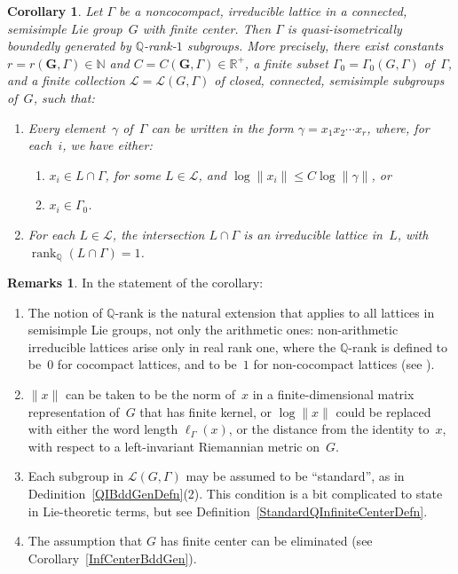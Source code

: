 \documentclass[pdftex]{sigma}
\newcommand{\NN}{\mathbb{N}}
\newcommand{\QQ}{\mathbb{Q}}
\newcommand{\RR}{\mathbb{R}}
\newcommand{\Ga}{\mathbf{G}}
\DeclareMathOperator{\rank}{rank}
\newcommand{\subgroups}{\mathcal{L}}
\numberwithin{equation}{section}
\newtheorem{cor}[thm]{Corollary}
\theoremstyle{definition}
\newtheorem{rems}[thm]{Remarks}
\begin{document}
\begin{cor} \label{QIBddGenLie}
Let $\Gamma$ be a noncocompact, irreducible lattice in a connected, semisimple Lie group~$G$ with finite center. Then $\Gamma$ is quasi-isometrically boundedly generated by $\QQ$-rank-$1$ subgroups. More precisely, there exist constants $r = r(\Ga,\Gamma) \in \NN$ and $C = C(\Ga,\Gamma) \in \RR^+$, a finite subset $\Gamma_0 = \Gamma_0(G,\Gamma)$ of~$\Gamma$, and a finite collection $\subgroups = \subgroups(G,\Gamma)$ of closed, connected, semisimple subgroups of~$G$, such that:
	\begin{enumerate}\itemsep=0pt
\item[$1.$] %
	 Every element~$\gamma$ of~$\Gamma$ can be written in the form $\gamma = x_1 x_2 \cdots x_r$, where, for each~$i$, we have either:
\begin{enumerate}\itemsep=0pt
\item[$(a)$] %
		$x_i \in L \cap \Gamma$, for some $L \in \subgroups$, and $\log \|x_i\| \le C \log \|\gamma\|$,
		or
\item[$(b)$] $x_i \in \Gamma_0$.
		\end{enumerate}
\item[$2.$] For each $L \in \subgroups$, the intersection $L \cap \Gamma$ is an irreducible lattice in~$L$, with $\rank_\QQ (L \cap \Gamma) = 1$.

	\end{enumerate}
\end{cor}

\begin{rems}
In the statement of the corollary:
\begin{enumerate}\itemsep=0pt
	\item The notion of $\QQ$-rank is the natural extension that applies to all lattices in semisimple Lie groups, not only the arithmetic ones: non-arithmetic irreducible lattices arise only in real rank one, where the $\QQ$-rank is defined to be~$0$ for cocompact lattices, and to be~$1$ for non-cocompact lattices (see \cite[Definition~9.1.8, pp.~193--194]{Morris-IntroArithGrps}).
	\item $\| x \|$ can be taken to be the norm of~$x$ in a finite-dimensional matrix representation of~$G$ that has finite kernel, or $\log \|x\|$ could be replaced with either the word length $\ell_\Gamma(x)$, or the distance from the identity to~$x$, with respect to a left-invariant Riemannian metric on~$G$.
	\item Each subgroup in $\subgroups(G,\Gamma)$ may be assumed to be ``standard'', as in Dedinition~\ref{QIBddGenDefn}(2). This condition is a bit complicated to state in Lie-theoretic terms, but see Definition~\ref{StandardQInfiniteCenterDefn}.
	\item The assumption that $G$ has finite center can be eliminated (see Corollary~\ref{InfCenterBddGen}).
	\end{enumerate}
\end{rems}
\end{document}
